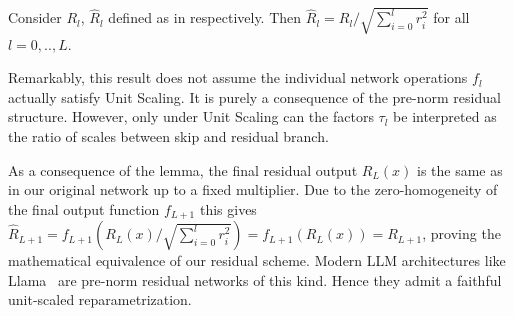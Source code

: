 \begin{lem} \label{lem:residual_symmetry}
    Consider $R_l$, $\hat{R}_l$ defined as in  respectively. Then $\hat{R}_l = R_l / \sqrt{\sum_{i=0}^l r_i^2}$ for all $l=0,..,L$.
\end{lem}
Remarkably, this result does not assume the individual network operations $f_l$ actually satisfy Unit Scaling. It is purely a consequence of the pre-norm residual structure. However, only under Unit Scaling can the factors $\tau_l$ be interpreted as the ratio of scales between skip and residual branch.

As a consequence of the lemma, the final residual output $R_L(x)$ is the same as in our original network up to a fixed multiplier. Due to the zero-homogeneity of the final output function $f_{L+1}$ this gives $\hat{R}_{L+1} = f_{L+1}\left(R_L(x)/\sqrt{\sum_{i=0}^l r_i^2}\right) = f_{L+1}(R_L(x)) = R_{L+1}$, proving the mathematical equivalence of our residual scheme.
Modern LLM architectures like Llama~\citep{Llama} are pre-norm residual networks of this kind. Hence they admit a faithful unit-scaled reparametrization.

